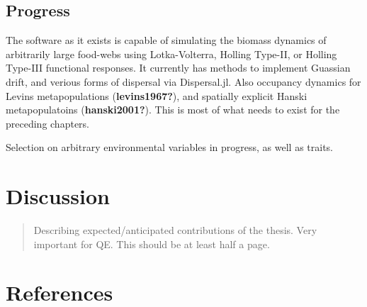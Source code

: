 \documentclass[10pt,oneside]{article}
\begin{document}
\hypertarget{progress-3}{%
\subsection{Progress}\label{progress-3}}

The software as it exists is capable of simulating the biomass dynamics
of arbitrarily large food-webs using Lotka-Volterra, Holling Type-II, or
Holling Type-III functional responses. It currently has methods to
implement Guassian drift, and verious forms of dispersal via
Dispersal.jl. Also occupancy dynamics for Levins metapopulations
(\textbf{levins1967?}), and spatially explicit Hanski metapopulatoins
(\textbf{hanski2001?}). This is most of what needs to exist for the
preceding chapters.

Selection on arbitrary environmental variables in progress, as well as
traits.

\hypertarget{discussion}{%
\section{Discussion}\label{discussion}}

\begin{quote}
Describing expected/anticipated contributions of the thesis. Very
important for QE. This should be at least half a page.
\end{quote}

\hypertarget{references}{%
\section*{References}\label{references}}
\end{document}
